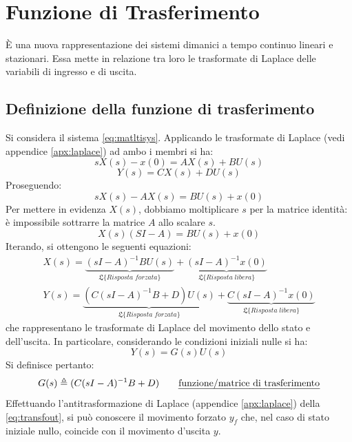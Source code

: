 \documentclass[a4paper]{report}
\begin{document}
\chapter{Funzione di Trasferimento}
\`E una nuova rappresentazione dei sistemi dimanici a tempo continuo
lineari e stazionari. Essa mette in relazione tra loro le trasformate
di Laplace delle variabili di ingresso e di uscita.

\section{Definizione della funzione di trasferimento}
Si considera il sistema \ref{eq:matltisys}. Applicando le
trasformate di Laplace (vedi appendice \ref{apx:laplace}) ad ambo i
membri si ha: 
\begin{displaymath}
  sX(s) - x(0) = AX(s) + BU(s)
\end{displaymath}
\begin{displaymath}
  Y(s) = CX(s) + DU(s)
\end{displaymath}
Proseguendo:
\[
  sX(s) - AX(s) = BU(s) + x(0)
\]
Per mettere in evidenza $X(s)$, dobbiamo moltiplicare $s$ per la
matrice identit\`a: \`e impossibile sottrarre la matrice $A$ allo
scalare $s$.
\[
  X(s)(SI - A) = BU(s) + x(0)
\]
Iterando, si ottengono le seguenti equazioni: 
\begin{eqnarray}\label{eq:tdlstateout}
  X(s)=\underbrace{(sI-A)^{-1}BU(s)}_{\mathfrak{L}\{Risposta \; forzata\}} +
  \underbrace{(sI-A)^{-1}x(0)}_{\mathfrak{L}\{Risposta \; libera\}}\\
  Y(s)=\underbrace{(C(sI-A)^{-1}B+D)U(s)}_{\mathfrak{L}\{Risposta \;
      forzata\}} +
  \underbrace{C(sI-A)^{-1}x(0)}_{\mathfrak{L}\{Risposta \; libera\}}
\end{eqnarray}
che rappresentano le trasformate di Laplace del movimento dello stato
e dell'uscita. In particolare, considerando le condizioni iniziali nulle si ha:
\begin{equation}\label{eq:transfout}
  Y(s)=G(s)U(s)
\end{equation}
Si definisce pertanto:
\begin{equation}\label{eq:fdt}
  G(s) \triangleq (C(sI-A)^{-1}B+D) \qquad
  \textrm{\emph{funzione/matrice di trasferimento}} 
\end{equation}
Effettuando l'antitrasformazione di Laplace (appendice
\ref{apx:laplace}) della \ref{eq:transfout}, si pu\`o conoscere il
movimento forzato $y_f$ che, nel caso di stato iniziale nullo,
coincide con il movimento d'uscita $y$.
\end{document}
